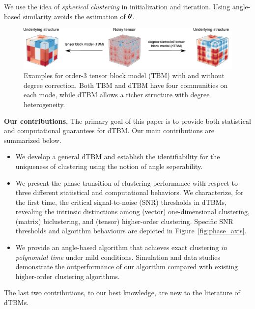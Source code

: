 \documentclass[lettersize,journal]{IEEEtran}
\theoremstyle{definition}
\theoremstyle{definition}
\def\fixme#1#2{\textbf{\color{red}[FIXME (#1): #2]}}
\begin{document}
{
\color{red}
We use the idea of \emph{spherical clustering} in initialization and iteration. Using angle-based similarity avoids the estimation of $\boldsymbol{\theta}$.  
}

\begin{figure}[t]
    \centering
    \includegraphics[width = .9\textwidth]{intro2_arxiv.pdf}
    \caption{Examples for order-3 tensor block model (TBM) with and without degree correction. Both TBM and dTBM have four communities on each mode, while dTBM allows a richer structure with degree heterogeneity.
    }
    \label{fig:intro}
\end{figure}

{\bf Our contributions.} The primary goal of this paper is to provide both statistical and computational guarantees for dTBM. Our main contributions are summarized below.
\begin{itemize}[leftmargin=*]

 \item We develop a general dTBM and establish the identifiability for the uniqueness of clustering using the notion of angle seperability.
 
        \item  We present the phase transition of clustering performance with respect to three different statistical and computational behaviors.  We characterize, for the first time, the critical signal-to-noise (SNR) thresholds in dTBMs, revealing the intrinsic distinctions among (vector) one-dimensional clustering, (matrix) biclustering, and (tensor) higher-order clustering. Specific SNR thresholds and algorithm behaviours are depicted in  Figure~\ref{fig:phase_axis}. 
        
    \item We provide an angle-based algorithm that achieves exact clustering \emph{in polynomial time} under mild conditions. Simulation and data studies demonstrate the outperformance of our algorithm compared with existing higher-order clustering algorithms. 
\end{itemize}
The last two contributions, to our best knowledge, are new to the literature of dTBMs. %
\end{document}
